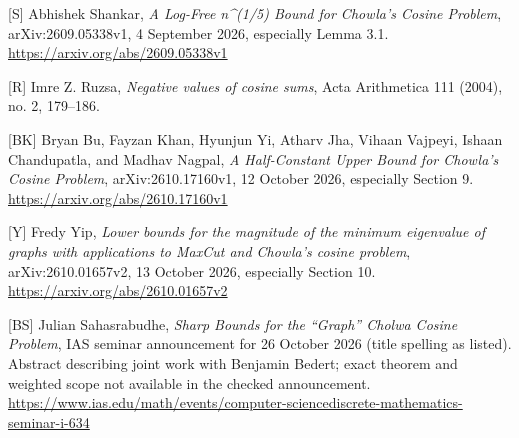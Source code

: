 \documentclass[11pt]{article}
\begin{document}
[S] Abhishek Shankar, \emph{A Log-Free n\textasciicircum{}(1/5) Bound for Chowla's Cosine Problem}, arXiv:2609.05338v1, 4 September 2026, especially Lemma 3.1. \url{https://arxiv.org/abs/2609.05338v1}

[R] Imre Z. Ruzsa, \emph{Negative values of cosine sums}, Acta Arithmetica 111 (2004), no. 2, 179--186.

[BK] Bryan Bu, Fayzan Khan, Hyunjun Yi, Atharv Jha, Vihaan Vajpeyi, Ishaan Chandupatla, and Madhav Nagpal, \emph{A Half-Constant Upper Bound for Chowla's Cosine Problem}, arXiv:2610.17160v1, 12 October 2026, especially Section 9. \url{https://arxiv.org/abs/2610.17160v1}

[Y] Fredy Yip, \emph{Lower bounds for the magnitude of the minimum eigenvalue of graphs with applications to MaxCut and Chowla's cosine problem}, arXiv:2610.01657v2, 13 October 2026, especially Section 10. \url{https://arxiv.org/abs/2610.01657v2}

[BS] Julian Sahasrabudhe, \emph{Sharp Bounds for the ``Graph'' Cholwa Cosine Problem}, IAS seminar announcement for 26 October 2026 (title spelling as listed). Abstract describing joint work with Benjamin Bedert; exact theorem and weighted scope not available in the checked announcement. \url{https://www.ias.edu/math/events/computer-sciencediscrete-mathematics-seminar-i-634}
\end{document}
